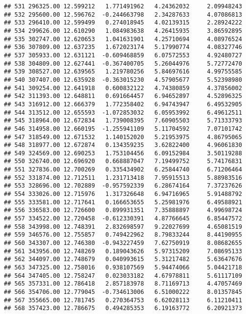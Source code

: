 \documentclass[
]{article}
\begin{document}
\begin{verbatim}
## 531 296325.00 12.599212   1.771491962   4.24362032     2.09948243
## 532 295600.00 12.596762  -0.244663798   2.34287633     4.07086813
## 533 296410.00 12.599499   0.274018945   4.02139315     2.28924222
## 534 299626.00 12.610290   1.084983638   4.26415935     3.86592895
## 535 302747.00 12.620653   1.041631901   4.25710694     4.08976524
## 536 307809.00 12.637235   1.672023174   5.17990774     4.08327746
## 537 305933.00 12.631121  -0.609468859   6.07572553     4.92480727
## 538 304809.00 12.627441  -0.367400705   5.26044976     5.72772470
## 539 308527.00 12.639565   1.219780256   5.84697616     4.99755585
## 540 307407.00 12.635928  -0.363015230   4.57905677     5.52398980
## 541 309254.00 12.641918   0.600832122   4.74380859     4.37856002
## 542 311393.00 12.648811   0.691664457   6.94652897     4.52896325
## 543 316912.00 12.666379   1.772358402   6.94743947     6.49532905
## 544 313512.00 12.655593  -1.072853032   6.05953992     6.49612511
## 545 318964.00 12.672834   1.739008395   7.60905503     5.71333793
## 546 314958.00 12.660195  -1.255941109   5.11704592     7.07101742
## 547 318549.00 12.671532   1.140152020   5.21953975     4.86795065
## 548 318977.00 12.672874   0.134359235   3.62822400     4.96061830
## 549 324569.00 12.690253   1.753104456   6.09152984     3.50119288
## 550 326740.00 12.696920   0.668887047   7.19499752     5.74176831
## 551 327836.00 12.700269   0.335434902   6.25844740     6.71206464
## 552 331874.00 12.712511   1.231713418   7.95915513     5.88983516
## 553 328696.00 12.702889  -0.957592339   6.28674164     7.37237626
## 554 333026.00 12.715976   1.317326648   6.94716965     5.91488792
## 555 333581.00 12.717641   0.166653655   5.25981976     6.49588921
## 556 336583.00 12.726600   0.899931351   7.35888897     4.99698724
## 557 334522.00 12.720458  -0.612330391   4.87766645     6.85447572
## 558 343998.00 12.748391   2.832698597   9.22027699     4.65081519
## 559 346576.00 12.755857   0.749422962   8.79833244     8.44190955
## 560 343307.00 12.746380  -0.943227459   7.62750919     8.08682655
## 561 343956.00 12.748269   0.189043626   5.97315209     7.08695133
## 562 344097.00 12.748679   0.040993615   5.31217482     5.63647676
## 563 347325.00 12.758016   0.938107569   5.94474066     5.04421718
## 564 347405.00 12.758247   0.023033182   4.67978811     5.61117109
## 565 357331.00 12.786418   2.857183978   8.71169713     4.47057469
## 566 354706.00 12.779045  -0.734613006   6.51000222     8.01357845
## 567 355665.00 12.781745   0.270364753   6.62028113     6.11210411
## 568 357423.00 12.786675   0.494285353   6.19163772     6.20921373

\end{verbatim}
\end{document}
